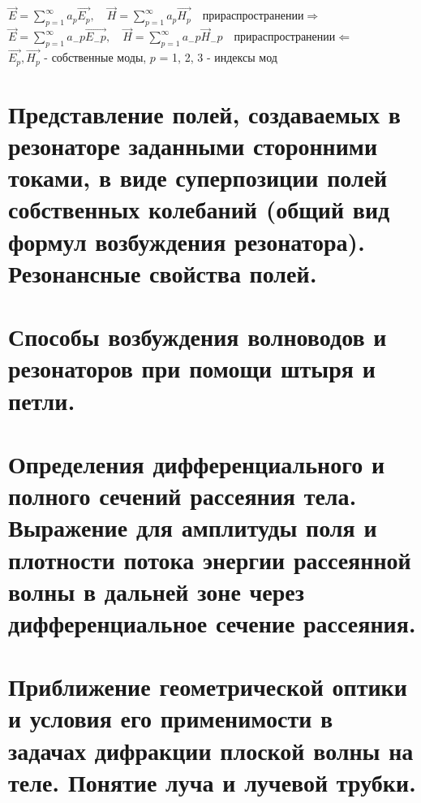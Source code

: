 \begin{multicols*}{2}
		$\vec{E} = \sum\limits_{p = 1}^{\infty} a_p\vec{E_p}, \quad \vec{H} = \sum\limits_{p = 1}^{\infty} a_p\vec{H_p} \quad при распространении \Longrightarrow $\\
		$\vec{E} = \sum\limits_{p = 1}^{\infty} a_-p\vec{E_-p}, \quad \vec{H} = \sum\limits_{p = 1}^{\infty} a_-p\vec{H}_-p \quad при распространении \Longleftarrow $\\
		$\vec{E_p}, \vec{H_p}$ - собственные моды, \quad $p$ = 1, 2, 3 - индексы мод
		
		\section{Представление полей, создаваемых в резонаторе заданными сторонними токами, в виде суперпозиции полей собственных колебаний (общий вид формул возбуждения резонатора). Резонансные свойства полей. }
		
		\section{Способы возбуждения волноводов и резонаторов при помощи штыря и петли.}
		
		\section{Определения дифференциального и полного сечений рассеяния тела. Выражение для амплитуды поля и плотности потока энергии рассеянной волны в дальней зоне через дифференциальное сечение рассеяния. }
		
		\section{Приближение геометрической оптики и условия его применимости в задачах дифракции плоской волны на теле. Понятие луча и лучевой трубки. }
		
	\end{multicols*}
